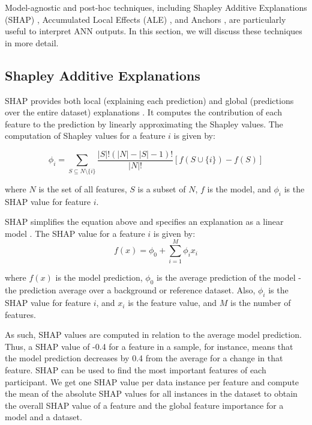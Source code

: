 Model-agnostic and post-hoc techniques, including Shapley Additive Explanations (SHAP) \cite{lundberg_unified_2017}, Accumulated Local Effects (ALE) \cite{apley_visualizing_2019}, and Anchors \cite{ribeiro_anchors_2018}, are particularly useful to interpret ANN outputs. In this section, we will discuss these techniques in more detail.


\subsection{Shapley Additive Explanations}
SHAP provides both local (explaining each prediction) and global (predictions over the entire dataset) explanations \cite{lundberg_unified_2017}. It computes the contribution of each feature to the prediction by linearly approximating the Shapley values. The computation of Shapley values for a feature $i$ is given by:

\begin{equation}
 \phi_i = \sum_{S \subseteq N \setminus \{i\}} \frac{|S|!(|N|-|S|-1)!}{|N|!} [f(S \cup \{i\}) - f(S)]
\end{equation}

where $N$ is the set of all features, $S$ is a subset of $N$, $f$ is the model, and $\phi_i$ is the SHAP value for feature $i$. 

SHAP simplifies the equation above and specifies an explanation as a linear model \cite{molnar_interpretable_nodate}. The SHAP value for a feature $i$ is given by:
\begin{equation}
 f(x) = \phi_0 + \sum_{i=1}^{M} \phi_i x_i
\end{equation}

where $f(x)$ is the model prediction, $\phi_0$ is the average prediction of the model - the prediction average over a background or reference dataset. Also, $\phi_i$ is the SHAP value for feature $i$, and $x_i$ is the feature value, and $M$ is the number of features.

As such, SHAP values are computed in relation to the average model prediction. Thus, a SHAP value of -0.4 for a feature in a sample, for instance,  means that the model prediction decreases by 0.4 from the average for a change in that feature. SHAP can be used to find the most important features of each participant. We get one SHAP value per data instance per feature and compute the mean of the absolute SHAP values for all instances in the dataset to obtain the overall SHAP value of a feature and the global feature importance for a model and a dataset. 


